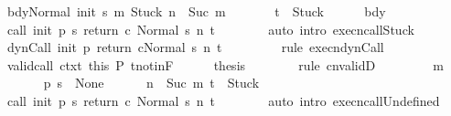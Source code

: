 \begin{isabellebody}
\ {\isachardoublequoteopen}{\isasymGamma}{\isasymturnstile}{\isasymlangle}bdy{\isacharcomma}Normal\ {\isacharparenleft}init\ s{\isacharparenright}{\isasymrangle}\ {\isacharequal}m{\isasymRightarrow}\ Stuck{\isachardoublequoteclose}\ {\isachardoublequoteopen}n\ {\isacharequal}\ Suc\ m{\isachardoublequoteclose}\ \isanewline
\ \ \ \ \ \ {\isachardoublequoteopen}t\ {\isacharequal}\ Stuck{\isachardoublequoteclose}\isanewline
\ \ \ \ \isamarkupfalse%
\ bdy\ \isamarkupfalse%
\ {\isachardoublequoteopen}{\isasymGamma}{\isasymturnstile}{\isasymlangle}call\ init\ {\isacharparenleft}p\ s{\isacharparenright}\ return{\isacharprime}\ c\ {\isacharcomma}Normal\ s{\isasymrangle}\ {\isacharequal}n{\isasymRightarrow}\ t{\isachardoublequoteclose}\isanewline
\ \ \ \ \ \ \isamarkupfalse%
\ {\isacharparenleft}auto\ intro{\isacharcolon}\ execn{\isacharunderscore}callStuck{\isacharparenright}\isanewline
\ \ \ \ \isamarkupfalse%
\ {\isachardoublequoteopen}{\isasymGamma}{\isasymturnstile}{\isasymlangle}dynCall\ init\ p\ return{\isacharprime}\ c{\isacharcomma}Normal\ s{\isasymrangle}\ {\isacharequal}n{\isasymRightarrow}\ t{\isachardoublequoteclose}\ \isanewline
\ \ \ \ \ \ \isamarkupfalse%
\ {\isacharparenleft}rule\ execn{\isacharunderscore}dynCall{\isacharparenright}\isanewline
\ \ \ \ \isamarkupfalse%
\ valid{\isacharunderscore}call\ ctxt\ this\ P\ t{\isacharunderscore}notin{\isacharunderscore}F\isanewline
\ \ \ \ \isamarkupfalse%
\ {\isacharquery}thesis\isanewline
\ \ \ \ \ \ \isamarkupfalse%
\ {\isacharparenleft}rule\ cnvalidD{\isacharparenright}\isanewline
\ \ \isamarkupfalse%
\isanewline
\ \ \ \ \isamarkupfalse%
\ m\isanewline
\ \ \ \ \isamarkupfalse%
\ {\isachardoublequoteopen}{\isasymGamma}\ {\isacharparenleft}p\ s{\isacharparenright}\ {\isacharequal}\ None{\isachardoublequoteclose}\isanewline
\ \ \ \ \ \ {\isachardoublequoteopen}n\ {\isacharequal}\ Suc\ m{\isachardoublequoteclose}\ {\isachardoublequoteopen}t\ {\isacharequal}\ Stuck{\isachardoublequoteclose}\isanewline
\ \ \ \ \isamarkupfalse%
\ {\isachardoublequoteopen}{\isasymGamma}{\isasymturnstile}{\isasymlangle}call\ init\ {\isacharparenleft}p\ s{\isacharparenright}\ return{\isacharprime}\ c\ {\isacharcomma}Normal\ s{\isasymrangle}\ {\isacharequal}n{\isasymRightarrow}\ t{\isachardoublequoteclose}\isanewline
\ \ \ \ \ \ \isamarkupfalse%
\ {\isacharparenleft}auto\ intro{\isacharcolon}\ execn{\isacharunderscore}callUndefined{\isacharparenright}\isanewline

\end{isabellebody}
